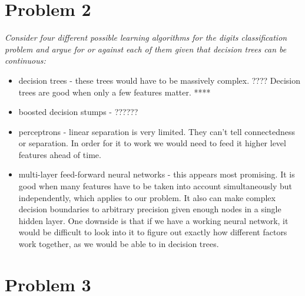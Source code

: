 \documentclass{article}
\begin{document}
  \section*{Problem 2}
  \textit{Consider four different possible learning algorithms for the
    digits classification problem and argue for or against each of
    them given that decision trees can be continuous:}
  \begin{itemize}
  \item decision trees - 
    these trees would have to be massively complex. ????
    Decision trees are good when only a few features matter. ****
  \item boosted decision stumps - ??????
  \item perceptrons - linear separation is very limited. They can't tell 
    connectedness or separation. In order for it to work we would need to
    feed it higher level features ahead of time.  

  \item multi-layer feed-forward neural networks - this appears most promising. 
    It is good when many features have to be taken into account simultaneously
    but independently, which applies to our problem. It also can make complex 
    decision boundaries to arbitrary precision given enough nodes in a single
    hidden layer. One downside is that if we have a working neural network,
    it would be difficult to look into it to figure out exactly how different
    factors work together, as we would be able to in decision trees. 
  \end{itemize}

  \section*{Problem 3}
\end{document}
